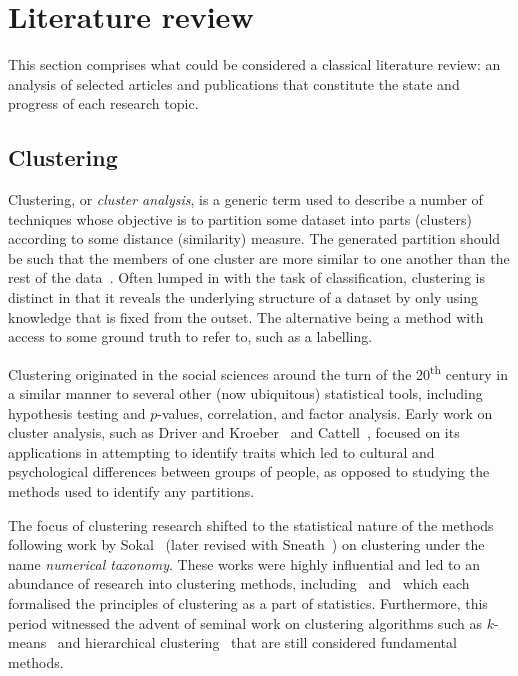 \section{Literature review}\label{sec:review}

This section comprises what could be considered a classical literature review:
an analysis of selected articles and publications that constitute the state and
progress of each research topic.


\subsection{Clustering}\label{subsec:clustering}

Clustering, or \emph{cluster analysis}, is a generic term used to describe a
number of techniques whose objective is to partition some dataset into parts
(clusters) according to some distance (similarity) measure. The generated
partition should be such that the members of one cluster are more similar to one
another than the rest of the data~\cite{Everitt2011}. Often lumped in with the
task of classification, clustering is distinct in that it reveals the underlying
structure of a dataset by only using knowledge that is fixed from the outset.
The alternative being a method with access to some ground truth to refer to,
such as a labelling.

Clustering originated in the social sciences around the turn of the
20\textsuperscript{th} century in a similar manner to several other (now
ubiquitous) statistical tools, including hypothesis testing and \(p\)-values,
correlation, and factor analysis. Early work on cluster analysis, such as Driver
and Kroeber~\cite{Driver1932} and Cattell~\cite{Cattell1943}, focused on its
applications in attempting to identify traits which led to cultural and
psychological differences between groups of people, as opposed to studying the
methods used to identify any partitions.

The focus of clustering research shifted to the statistical nature of the
methods following work by Sokal~\cite{Sokal1966} (later revised with
Sneath~\cite{Sneath1973}) on clustering under the name \emph{numerical
taxonomy}. These works were highly influential and led to an abundance of
research into clustering methods, including~\cite{Diday1976}
and~\cite{Hartigan1975} which each formalised the principles of clustering as a
part of statistics. Furthermore, this period witnessed the advent of seminal
work on clustering algorithms such as \(k\)-means~\cite{Hartigan1979} and
hierarchical clustering~\cite{Defays1977,Sibson1973} that are still considered
fundamental methods.

